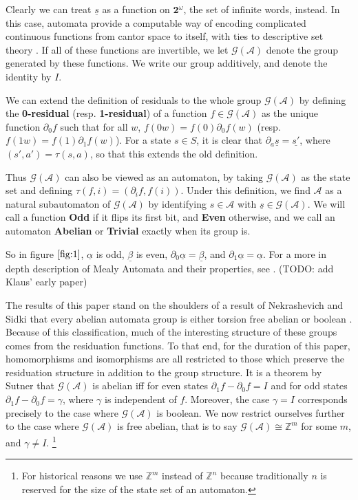 \documentclass[runningheads]{llncs}
\newcommand{\A}{\mathcal{A}}
\newcommand{\G}{\mathcal{G}}
\newcommand{\Z}{\mathbb{Z}}
\newcommand{\2}{\textbf{2}}
\newcommand{\del}{\partial}
\begin{document}
Clearly we can treat $\underline{s}$ as a function 
on $\2^\omega$, the set of infinite words, instead. In this case, automata 
provide a computable way of encoding complicated continuous functions from 
cantor space to itself, with ties to descriptive set theory%
\cite{skrzypczak15:descriptive}. If all of these functions are invertible, 
we let $\G(\A)$ denote the group generated by these functions. We write our
group additively, and denote the identity by $I$.

We can extend the definition of residuals to the whole group $\G(\A)$ by
defining the \textbf{0-residual} (resp. \textbf{1-residual}) of a 
function $f \in \G(\A)$ as the unique function 
$\del_0 f$ such that for all $w$, $f(0w) = f(0) \del_0 f(w)$ 
(resp. $f(1w) = f(1) \del_1 f(w)$). 
For a state $s \in S$, it is clear that 
$\del_a \underline{s} = \underline{s'}$, where $(s',a') = \tau(s,a)$, so
that this extends the old definition. 

Thus $\G(\A)$ can also be viewed as an automaton, by taking $\G(\A)$ 
as the state set and defining $\tau(f,i) = (\del_i f, f(i))$. Under this
definition, we find $\A$ as a natural subautomaton of $\G(\A)$ by identifying 
$s \in \A$ with $\underline{s} \in \G(\A)$.
We will call a function \textbf{Odd} if it flips its first bit, and 
\textbf{Even} otherwise, and we call an automaton \textbf{Abelian} or 
\textbf{Trivial} exactly when its group is. 

So in figure $\ref{fig:1}$, $\underline{\alpha}$ is odd, $\underline{\beta}$ 
is even, $\del_0 \underline{\alpha} = \underline{\beta}$, 
and $\del_1 \underline{\alpha} = \underline{\alpha}$.
For a more in depth description of Mealy Automata and their properties, 
see \cite{Sakarovitch09:automata_theory,Holcombe}. (TODO: add Klaus' early paper)

The results of this paper stand on the shoulders of a result of Nekrashevich and 
Sidki that every abelian automata group is either torsion free abelian or 
boolean \cite{NekrashevychSidki04:automorphisms}. Because of this classification, 
much of the interesting structure of these groups comes from the residuation
functions. To that end, for the duration of this paper, 
homomorphisms and isomorphisms are all restricted to those 
which preserve the residuation structure in addition to the group structure.
It is a theorem by Sutner \cite{Sutner18:abelian_automata} 
that $\G(\A)$ is abelian iff for even states $\del_1 f - \del_0 f = I$ 
and for odd states $\del_1 f - \del_0 f = \gamma$, where $\gamma$ is 
independent of $f$. Moreover, the case $\gamma = I$ corresponds 
precisely to the case where $\G(\A)$ is boolean.
We now restrict ourselves further to the case where $\G(\A)$ is 
free abelian, that is to say $\G(\A) \cong \Z^m$ for some $m$,
and $\gamma \not = I$.%
\footnote%
{%
  For historical reasons we use $\Z^m$ instead of $\Z^n$ because 
  traditionally $n$ is reserved for the size of the state set of 
  an automaton.
}
\end{document}
